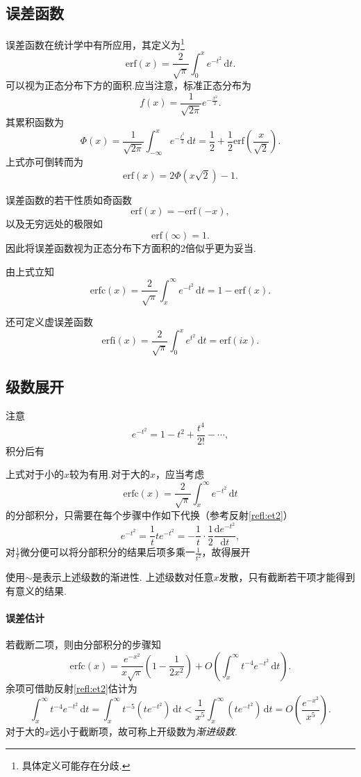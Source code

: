 \documentclass[UTF-8]{ctexart}
\newcommand{\dr}{\mathrm{d}}
\newcommand{\dt}[1]{\frac{\mathrm{d}#1}{\mathrm{d}t}}
\newcommand{\pare}[1]{\left(#1\right)}
\newcommand{\half}{\frac{1}{2}}
\newcommand{\intu}[3]{\int_0^{#1} #2 \, \dr #3}
\newcommand{\intiu}[3]{\int_{-\infty}^{#1} #2 \, \dr #3}
\newcommand{\intbi}[3]{\int_{#1}^{\infty} #2 \, \dr #3}
\newtheorem{reflection}{反射}
\newcommand{\refl}[1]{\vspace{0.5em}\par\noindent\fbox{%
    \parbox{\textwidth}{%
    \begin{reflection}
        #1
    \end{reflection}
    }%
}\vspace{0.5em}\par}
\newcommand{\rref}[1]{反射\ref{refl:#1}}
\begin{document}
  \subsection{误差函数}
  \newcommand{\erf}{\mathrm{erf}}
  \newcommand{\erfi}{\mathrm{erfi}}
  \newcommand{\erfc}{\mathrm{erfc}}
  \newcommand{\ehxs}[1]{e^{-\frac{#1^2}{2}}}
  误差函数在统计学中有所应用，其定义为\footnote{具体定义可能存在分歧.}
  \[ \erf\pare{x} = \frac{2}{\sqrt{\pi}}\intu{x}{e^{-t^2}}{t}. \]
  可以视为正态分布下方的面积.应当注意，标准正态分布为
  \[ f\pare{x} = \frac{1}{\sqrt{2\pi}} e^{-\frac{x^2}{2}}. \]
  其累积函数为
  \[ \Phi\pare{x} = \frac{1}{\sqrt{2\pi}} \intiu{x}{\ehxs{t}}{t} = \half + \half \erf\pare{\frac{x}{\sqrt{2}}}. \]
  上式亦可倒转而为
  \[ \erf\pare{x} = 2\Phi\pare{x\sqrt{2}}-1. \]
  \par 误差函数的若干性质如奇函数
  \[ \erf\pare{x} = -\erf\pare{-x}, \]
  以及无穷远处的极限如
  \[ \erf\pare{\infty} = 1. \]
  因此将误差函数视为正态分布下方面积的2倍似乎更为妥当.
  \par
  由上式立知
  \[ \erfc\pare{x} = \frac{2}{\sqrt{\pi}} \intbi{x}{e^{-t^2}}{t} = 1-\erf\pare{x}. \]
  \par
  还可定义虚误差函数
  \[ \erfi\pare{x} = \frac{2}{\sqrt{\pi}}\intu{x}{e^{t^2}}{t} = \erf\pare{ix}. \]
  \subsection{级数展开}
  注意\[ e^{-t^2} = 1-t^2+\frac{t^4}{2!}-\cdots, \]
  积分后有
  \refl{
    \[ \erf\pare{x} = \frac{2}{\sqrt{\pi}}\pare{x-\frac{x^3}{3}+\frac{x^5}{5\cdot2!}-\cdots}. \]
  }
  上式对于小的$x$较为有用.对于大的$x$，应当考虑
  \[ \erfc\pare{x} = \frac{2}{\sqrt{\pi}}\intbi{x}{e^{-t^2}}{t} \]
  的分部积分，只需要在每个步骤中作如下代换（参考\rref{et2}）
  \[ e^{-t^2} = \frac{1}{t} t e^{-t^2} = -\frac{1}{t} \cdot \half \dt{e^{-t^2}}, \]
  对$\frac{1}{t}$微分便可以将分部积分的结果后项多乘一$\frac{1}{t^2}$，故得展开
  \refl{
    \[ \erfc\pare{x} = 1 - \erf\pare{x} \sim \frac{e^{-x^2}}{x\sqrt{\pi}}\pare{1-\frac{1}{2x^2} + \frac{1\cdot 3}{\pare{2x^2}^2} - \frac{1\cdot 3\cdot 5}{\pare{2x^2}^3} +\cdots }. \]
  }
  使用$\sim$是表示上述级数的渐进性. 上述级数对任意$x$发散，只有截断若干项才能得到有意义的结果.
  \paragraph{误差估计}若截断二项，则由分部积分的步骤知
  \[ \erfc\pare{x} =  \frac{e^{-x^2}}{x\sqrt{\pi}}\pare{1-\frac{1}{2x^2}} + O\pare{\intbi{x}{t^{-4}e^{-t^2}}{t}}. \]
  余项可借助\rref{et2}估计为
  \[ \intbi{x}{t^{-4}e^{-t^2}}{t} = \intbi{x}{t^{-5}\pare{te^{-t^2}}}{t} < \frac{1}{x^5}\intbi{x}{\pare{te^{-t^2}}}{t} = O\pare{\frac{e^{-x^2}}{x^5}}. \]
  对于大的$x$远小于截断项，故可称上开级数为\emph{渐进级数}.
\end{document}

